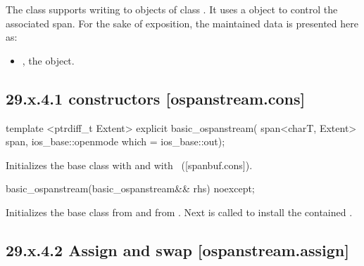 \documentclass[ebook,11pt,article]{memoir}
\renewcommand{\iref}[1]{[#1]}
\begin{document}
\pnum
The class
supports writing to objects of class
.
It uses a
object to control the associated span.
For the sake of exposition, the maintained data is presented here as:
\begin{itemize}
\item
{}, the  object.
\end{itemize}

\subsection{29.x.4.1  constructors [ospanstream.cons]}
\label{ospanstream.cons}

\begin{itemdecl}
template <ptrdiff_t Extent>
explicit basic_ospanstream(
  span<charT, Extent> span,
  ios_base::openmode which = ios_base::out);
\end{itemdecl}

\begin{itemdescr}
\pnum
\effects
Initializes the base class with
and  with
~(\iref{spanbuf.cons}).
\end{itemdescr}

\begin{itemdecl}
basic_ospanstream(basic_ospanstream&& rhs) noexcept;
\end{itemdecl}

\begin{itemdescr}
\pnum
\effects 
Initializes the base class from  
and  from .
Next  is called to
install the contained .
\end{itemdescr}

\subsection{29.x.4.2 Assign and swap [ospanstream.assign]}
\label{ospanstream.assign}
\end{document}
